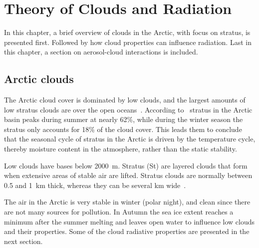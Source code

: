 \chapter{Theory of Clouds and Radiation}%
\label{chap:theory}
In this chapter, a brief overview of clouds in the Arctic, with focus on stratus, is presented first. Followed by how cloud properties can influence radiation. Last in this chapter, a section on aerosol-cloud interactions is included.


\section{Arctic clouds}%
The Arctic cloud cover is dominated by low clouds, and the largest amounts of low stratus clouds are over the open oceans~\citep{Klein1993}. %
 According to~\citet{Klein1993} stratus in the Arctic basin peaks during summer at nearly 62\%, while during the winter season the stratus only accounts for 18\% of the cloud cover. This leads them to conclude that the seasonal cycle of stratus in the Arctic is driven by the temperature cycle, thereby moisture content in the atmosphere, rather than the static stability.

Low clouds have bases below 2000~m. Stratus (St) are layered clouds that form when extensive areas of stable air are lifted. Stratus clouds are normally between 0.5 and 1~km thick, whereas they can be several km wide~\citep{Aguado2010}.

The air in the Arctic is very stable in winter (polar night), and clean since there are not many sources for pollution. In Autumn the sea ice extent reaches a minimum after the summer melting and leaves open water to influence low clouds and their properties.  Some of the cloud radiative properties are presented in the next section.

